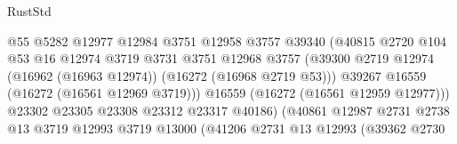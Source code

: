 \begin{lexlean}{RustStd}
\begin{coremodule}
                                            @55
                                            @5282
                                            @12977
                                            @12984
                                            @3751
                                            @12958
                                            @3757
                                            @39340
                                            (@40815
                                              @2720
                                              @104
                                              @53
                                              @16
                                              @12974
                                              @3719
                                              @3731
                                              @3751
                                              @12968
                                              @3757
                                              (@39300
                                                @2719
                                                @12974
                                                (@16962 (@16963 @12974))
                                                (@16272 (@16968 @2719 @53)))
                                              @39267
                                              @16559
                                              (@16272 (@16561 @12969 @3719)))
                                            @16559
                                            (@16272 (@16561 @12959 @12977)))
                                          @23302
                                          @23305
                                          @23308
                                          @23312
                                          @23317
                                          @40186)
                                        (@40861
                                          @12987
                                          @2731
                                          @2738
                                          @13
                                          @3719
                                          @12993
                                          @3719
                                          @13000
                                          (@41206
                                            @2731
                                            @13
                                            @12993
                                            (@39362
                                              @2730

\end{coremodule}
\end{lexlean}
